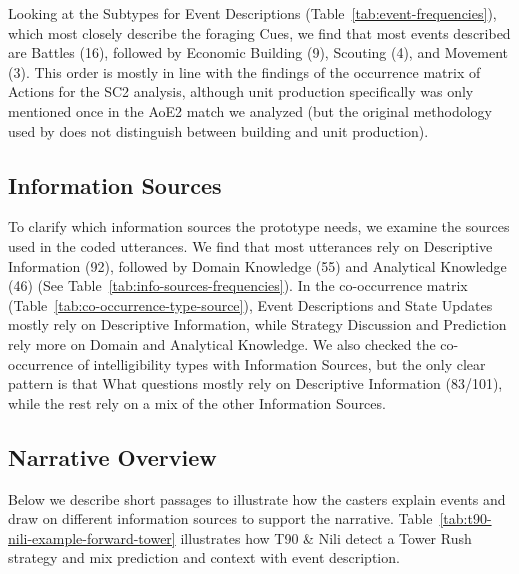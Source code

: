 Looking at the Subtypes for Event Descriptions (Table~\ref{tab:event-frequencies}), which most closely describe the foraging Cues, we find that most events described are Battles (16), followed by Economic Building (9), Scouting (4), and Movement (3). This order is mostly in line with the findings of the occurrence matrix of Actions for the SC2 analysis, although unit production specifically was only mentioned once in the AoE2 match we analyzed (but the original methodology used by \citet{dodge2018} does not distinguish between building and unit production).

\subsection{Information Sources}
To clarify which information sources the prototype needs, we examine the sources used in the coded utterances. We find that most utterances rely on Descriptive Information (92), followed by Domain Knowledge (55) and Analytical Knowledge (46) (See Table~\ref{tab:info-sources-frequencies}). In the co-occurrence matrix (Table~\ref{tab:co-occurrence-type-source}), Event Descriptions and State Updates mostly rely on Descriptive Information, while Strategy Discussion and Prediction rely more on Domain and Analytical Knowledge. We also checked the co-occurrence of intelligibility types with Information Sources, but the only clear pattern is that What questions mostly rely on Descriptive Information (83/101), while the rest rely on a mix of the other Information Sources.

\subsection{Narrative Overview}

Below we describe short passages to illustrate how the casters explain events and draw on different information sources to support the narrative. Table~\ref{tab:t90-nili-example-forward-tower} illustrates how T90 \& Nili detect a Tower Rush strategy and mix prediction and context with event description.

